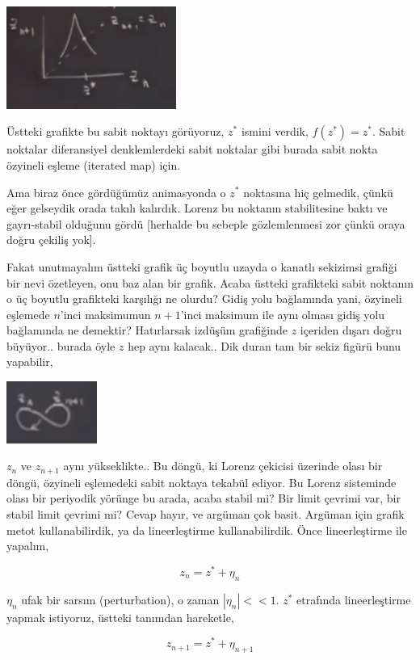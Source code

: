 \documentclass[12pt,fleqn]{article}\usepackage{../../common}
\begin{document}
\includegraphics[width=15em]{18_09.png}

Üstteki grafikte bu sabit noktayı görüyoruz, $z^\ast$ ismini verdik, $f(z^\ast) =
z^\ast$. Sabit noktalar diferansiyel denklemlerdeki sabit noktalar gibi burada
sabit nokta özyineli eşleme (iterated map) için. 

Ama biraz önce gördüğümüz animasyonda o $z^\ast$ noktasına hiç gelmedik, çünkü
eğer gelseydik orada takılı kalırdık. Lorenz bu noktanın stabilitesine
baktı ve gayrı-stabil olduğunu gördü [herhalde bu sebeple gözlemlenmesi zor
çünkü oraya doğru çekiliş yok].

Fakat unutmayalım üstteki grafik üç boyutlu uzayda o kanatlı sekizimsi
grafiği bir nevi özetleyen, onu baz alan bir grafik. Acaba üstteki
grafikteki sabit noktanın o üç boyutlu grafikteki karşılığı ne olurdu?
Gidiş yolu bağlamında yani, özyineli eşlemede $n$'inci maksimumun
$n+1$'inci maksimum ile aynı olması gidiş yolu bağlamında ne demektir?
Hatırlarsak izdüşüm grafiğinde $z$ içeriden dışarı doğru büyüyor.. burada
öyle $z$ hep aynı kalacak.. Dik duran tam bir sekiz figürü bunu yapabilir,

\includegraphics[width=8em]{18_10.png}

$z_n$ ve $z_{n+1}$ aynı yükseklikte.. Bu döngü, ki Lorenz çekicisi üzerinde
olası bir döngü, özyineli eşlemedeki sabit noktaya tekabül ediyor. Bu
Lorenz sisteminde olası bir periyodik yörünge bu arada, acaba stabil mi?
Bir limit çevrimi var, bir stabil limit çevrimi mi? Cevap hayır, ve argüman
çok basit. Argüman için grafik metot kullanabilirdik, ya da lineerleştirme
kullanabilirdik. Önce lineerleştirme ile yapalım,

$$ z_n = z^\ast + \eta_n$$ 

$\eta_n$ ufak bir sarsım (perturbation), o zaman $|\eta_n| << 1$. $z^\ast$
etrafında lineerleştirme yapmak istiyoruz, üstteki tanımdan hareketle,

$$ z_{n+1} =  z^\ast + \eta_{n+1} $$
\end{document}
